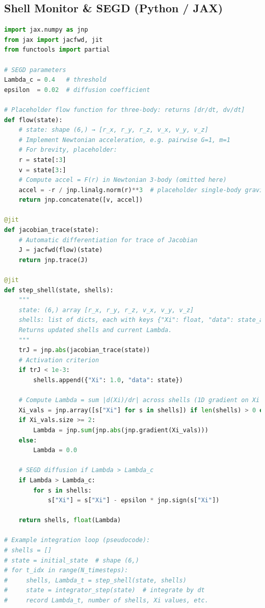 \documentclass[11pt]{article}
\begin{document}
\subsection{Shell Monitor \& SEGD (Python / JAX)}\label{app:segd}
\begin{lstlisting}[language=Python,caption={shells.py — Shell activation \& SEGD},label={code:shells}]
import jax.numpy as jnp
from jax import jacfwd, jit
from functools import partial

# SEGD parameters
Lambda_c = 0.4   # threshold
epsilon  = 0.02  # diffusion coefficient

# Placeholder flow function for three-body: returns [dr/dt, dv/dt]
def flow(state):
    # state: shape (6,) → [r_x, r_y, r_z, v_x, v_y, v_z]
    # Implement Newtonian acceleration, e.g. pairwise G=1, m=1
    # For brevity, placeholder:
    r = state[:3]
    v = state[3:]
    # Compute accel = F(r) in Newtonian 3-body (omitted here)
    accel = -r / jnp.linalg.norm(r)**3  # placeholder single-body gravity
    return jnp.concatenate([v, accel])

@jit
def jacobian_trace(state):
    # Automatic differentiation for trace of Jacobian
    J = jacfwd(flow)(state)
    return jnp.trace(J)

@jit
def step_shell(state, shells):
    """
    state: (6,) array [r_x, r_y, r_z, v_x, v_y, v_z]
    shells: list of dicts, each with keys {"Xi": float, "data": state_at_activation}
    Returns updated shells and current Lambda.
    """
    trJ = jnp.abs(jacobian_trace(state))
    # Activation criterion
    if trJ < 1e-3:
        shells.append({"Xi": 1.0, "data": state})

    # Compute Lambda = sum |d(Xi)/dr| across shells (1D gradient on Xi values)
    Xi_vals = jnp.array([s["Xi"] for s in shells]) if len(shells) > 0 else jnp.array([0.0])
    if Xi_vals.size >= 2:
        Lambda = jnp.sum(jnp.abs(jnp.gradient(Xi_vals)))
    else:
        Lambda = 0.0

    # SEGD diffusion if Lambda > Lambda_c
    if Lambda > Lambda_c:
        for s in shells:
            s["Xi"] = s["Xi"] - epsilon * jnp.sign(s["Xi"])

    return shells, float(Lambda)

# Example integration loop (pseudocode):
# shells = []
# state = initial_state  # shape (6,)
# for t_idx in range(N_timesteps):
#     shells, Lambda_t = step_shell(state, shells)
#     state = integrator_step(state)  # integrate by dt
#     record Lambda_t, number of shells, Xi values, etc.
\end{lstlisting}
\end{document}
